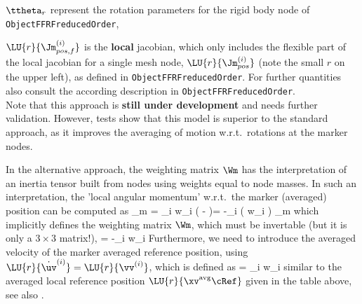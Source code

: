       \item $\ttheta_{r}$ represent the rotation parameters for the rigid body node of \texttt{ObjectFFRFreducedOrder},
      \item $\LU{r}{\Jm_{pos,f}^{(i)}}$ is the {\bf local} jacobian, which only includes the flexible part of the local 
            jacobian for a single mesh node, $\LU{r}{\Jm_{pos}^{(i)}}$ (note the small $r$ on the upper left), 
            as defined in \texttt{ObjectFFRFreducedOrder}.
     \ei
    For further quantities also consult the according description in \texttt{ObjectFFRFreducedOrder}.
    \vspace{6pt}\\
    Note that this approach is {\bf still under development} and needs further validation. 
    However, tests show that this model is superior to the standard approach, as it improves the averaging of motion w.r.t.\ rotations
    at the marker nodes.

    In the alternative approach, the weighting matrix $\Wm$ 
    has the interpretation of an inertia tensor built from nodes using weights equal to node masses.
    In such an interpretation, the 'local angular momentum' w.r.t.\ the marker (averaged) position can be computed as 
    \be \label{eq:MarkerSuperElementRigid:omegaAndWm}
       \Wm {}_{m} = \sum_i w_i  \left( - \right)= 
       -\sum_i  \left( w_i   \right) _{m}
    \ee
    which implicitly defines the weighting matrix $\Wm$, which must be invertable (but it is only a $3 \times 3$ matrix!),
    \be
        \Wm = -\sum_i  w_i  
    \ee
    Furthermore, we need to introduce the averaged velocity of the marker averaged reference position, using $\LU{r}{\dot \uv^{(i)}} = \LU{r}{\vv^{(i)}}$, which is defined as
    \be
       = \sum_i  w_i  \eqComma
    \ee
    similar to the averaged local reference position $\LU{r}{\xv^\mathrm{avg}\cRef}$ given in the table above, see also .


